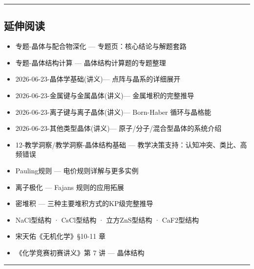 \begin{center}\rule{0.5\linewidth}{0.5pt}\end{center}

\subsection{延伸阅读}\label{ux5ef6ux4f38ux9605ux8bfb}

\begin{itemize}
\tightlist
\item
  专题-晶体与配合物深化 --- 专题页：核心结论与解题套路
\item
  专题-晶体结构计算 --- 晶体结构计算题的专题整理
\item
  2026-06-23-晶体学基础(讲义)--- 点阵与晶系的详细展开
\item
  2026-06-23-金属键与金属晶体(讲义)--- 金属堆积的完整推导
\item
  2026-06-23-离子键与离子晶体(讲义)--- Born-Haber 循环与晶格能
\item
  2026-06-23-其他类型晶体(讲义)--- 原子/分子/混合型晶体的系统介绍
\item
  12-教学洞察/教学洞察-晶体结构基础 --- 教学决策支持：认知冲突、类比、高频错误
\item
  Pauling规则 --- 电价规则详解与更多实例
\item
  离子极化 --- Fajans 规则的应用拓展
\item
  密堆积 --- 三种主要堆积方式的KP级完整推导
\item
  NaCl型结构 · CsCl型结构 · 立方ZnS型结构 · CaF2型结构
\item
  宋天佑《无机化学》§10-11 章
\item
  《化学竞赛初赛讲义》第 7 讲 --- 晶体结构
\end{itemize}

\begin{center}\rule{0.5\linewidth}{0.5pt}\end{center}
